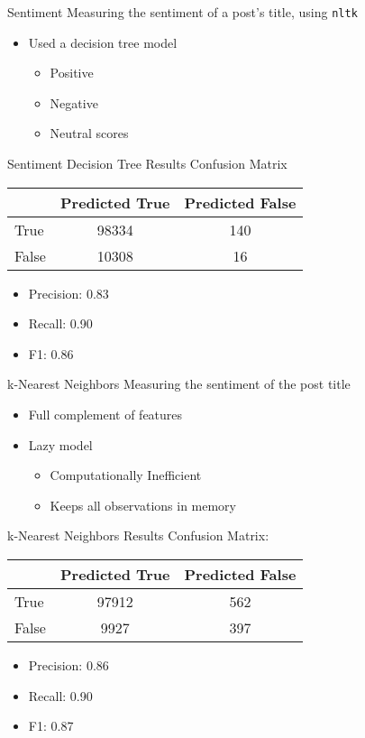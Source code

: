 \documentclass[10pt,t]{beamer}
\newcommand{\bi}{\begin{itemize}}                                 %
\newcommand{\ei}{\end{itemize}}                                   %
\begin{document}
\begin{frame}{Sentiment}
Measuring the sentiment of a post's title, using \texttt{nltk}
	\bi
		\item Used a decision tree model
		\bi
			\item Positive
			\item Negative
			\item Neutral scores
		\ei
	\ei
\end{frame}

\begin{frame}[c]{Sentiment Decision Tree Results}
Confusion Matrix

\begin{table}
	\begin{tabular}{l | c | c }
		& Predicted True & Predicted False\\
		\hline \hline
		True & 98334 & 140\\ 
		False & 10308 & 16
	\end{tabular}
\end{table}
\bi
	\item Precision: 0.83
	\item Recall: 0.90
	\item F1: 0.86
\ei
\end{frame}

\begin{frame}{k-Nearest Neighbors}
Measuring the sentiment of the post title
	\bi
		\item Full complement of features
		\item Lazy model
			\bi
				\item Computationally Inefficient
				\item Keeps all observations in memory
			\ei
	\ei
\end{frame}

\begin{frame}[c]{k-Nearest Neighbors Results}
Confusion Matrix:

\begin{table}
	\begin{tabular}{l | c | c }
		& Predicted True & Predicted False\\
		\hline \hline
		True & 97912 & 562\\ 
		False & 9927 & 397
	\end{tabular}
\end{table}
\bi
	\item Precision: 0.86
	\item Recall: 0.90
	\item F1: 0.87
\ei
\end{frame}
\end{document}
